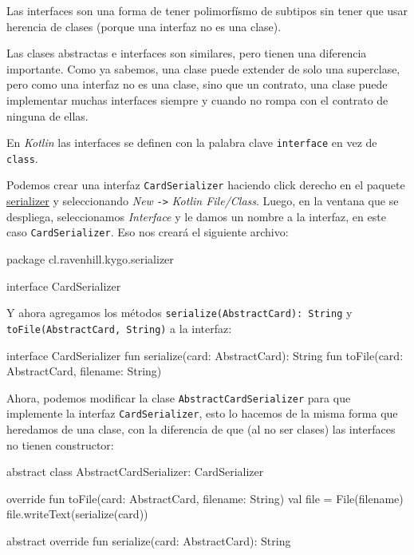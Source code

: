   \begin{important}
    Las interfaces son una forma de tener polimorfísmo de subtipos sin tener que usar herencia de 
    clases (porque una interfaz no es una clase).  
  \end{important}
  
  Las clases abstractas e interfaces son similares, pero tienen una diferencia importante.
  Como ya sabemos, una clase puede extender de solo una superclase, pero como una interfaz no es una
  clase, sino que un contrato, una clase puede implementar muchas interfaces siempre y cuando no
  rompa con el contrato de ninguna de ellas.
  
  En \textit{Kotlin} las interfaces se definen con la palabra clave \texttt{interface} en vez de
  \texttt{class}.

  Podemos crear una interfaz \texttt{CardSerializer} haciendo click derecho en el paquete
  \url{serializer} y seleccionando \textit{New} \texttt{->} \textit{Kotlin File/Class}.
  Luego, en la ventana que se despliega, seleccionamos \textit{Interface} y le damos un nombre a la
  interfaz, en este caso \texttt{CardSerializer}.
  Eso nos creará el siguiente archivo:

  \begin{kotlin}
    package cl.ravenhill.kygo.serializer

    interface CardSerializer {
    }
  \end{kotlin}

  Y ahora agregamos los métodos \texttt{serialize(AbstractCard): String} y 
  \texttt{toFile(AbstractCard, String)} a la interfaz:

  \begin{kotlin}
    interface CardSerializer {
      fun serialize(card: AbstractCard): String
      fun toFile(card: AbstractCard, filename: String)
    }
  \end{kotlin}

  Ahora, podemos modificar la clase \texttt{AbstractCardSerializer} para que implemente la interfaz
  \texttt{CardSerializer}, esto lo hacemos de la misma forma que heredamos de una clase, con la
  diferencia de que (al no ser clases) las interfaces no tienen constructor:

  \begin{kotlin}
    abstract class AbstractCardSerializer: CardSerializer {
      override fun toFile(card: AbstractCard, filename: String) {
        val file = File(filename)
        file.writeText(serialize(card))
      }

      abstract override fun serialize(card: AbstractCard): String
    }
  \end{kotlin}

